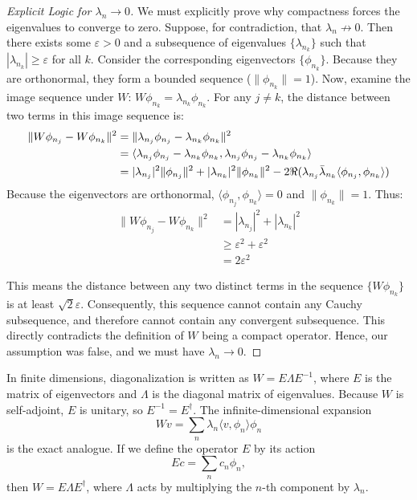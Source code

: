\begin{proof}[Explicit Logic for $\lambda_n \to 0$]
We must explicitly prove why compactness forces the eigenvalues to converge to zero.
Suppose, for contradiction, that $\lambda_n \not\to 0$. Then there exists some $\varepsilon > 0$ and a subsequence of eigenvalues $\{\lambda_{n_k}\}$ such that $|\lambda_{n_k}| \geq \varepsilon$ for all $k$.
Consider the corresponding eigenvectors $\{\phi_{n_k}\}$. Because they are orthonormal, they form a bounded sequence ($\|\phi_{n_k}\| = 1$).
Now, examine the image sequence under $W$: $W\phi_{n_k} = \lambda_{n_k} \phi_{n_k}$.
For any $j \neq k$, the distance between two terms in this image sequence is:
\begin{align}
\|W\phi_{n_j} - W\phi_{n_k}\|^2 &= \|\lambda_{n_j} \phi_{n_j} - \lambda_{n_k} \phi_{n_k}\|^2 \notag \\
    &= \langle \lambda_{n_j} \phi_{n_j} - \lambda_{n_k} \phi_{n_k}, \lambda_{n_j} \phi_{n_j} - \lambda_{n_k} \phi_{n_k} \rangle \notag \\
    &= |\lambda_{n_j}|^2 \|\phi_{n_j}\|^2 + |\lambda_{n_k}|^2 \|\phi_{n_k}\|^2 - 2\Re(\lambda_{n_j} \bar{\lambda}_{n_k} \langle \phi_{n_j}, \phi_{n_k} \rangle)
\end{align}
Because the eigenvectors are orthonormal, $\langle \phi_{n_j}, \phi_{n_k} \rangle = 0$ and $\|\phi_{n_k}\| = 1$. Thus:
\begin{equation}
\begin{aligned}
\|W\phi_{n_j} - W\phi_{n_k}\|^2 &= |\lambda_{n_j}|^2 + |\lambda_{n_k}|^2 \\
&\geq \varepsilon^2 + \varepsilon^2 \\
&= 2\varepsilon^2
\end{aligned}
\end{equation}

This means the distance between any two distinct terms in the sequence $\{W\phi_{n_k}\}$ is at least $\sqrt{2}\varepsilon$. Consequently, this sequence cannot contain any Cauchy subsequence, and therefore cannot contain any convergent subsequence. This directly contradicts the definition of $W$ being a compact operator. Hence, our assumption was false, and we must have $\lambda_n \to 0$.
\end{proof}

\begin{remark}
In finite dimensions, diagonalization is written as $W = E \Lambda E^{-1}$, where $E$ is the matrix of eigenvectors and $\Lambda$ is the diagonal matrix of eigenvalues. Because $W$ is self-adjoint, $E$ is unitary, so $E^{-1} = E^\dagger$.
The infinite-dimensional expansion \[
Wv = \sum_n \lambda_n \langle v, \phi_n \rangle \phi_n
\] is the exact analogue. If we define the operator $E$ by its action \[
E c = \sum_n c_n \phi_n,
\] then $W = E \Lambda E^\dagger$, where $\Lambda$ acts by multiplying the $n$-th component by $\lambda_n$.
\end{remark}

